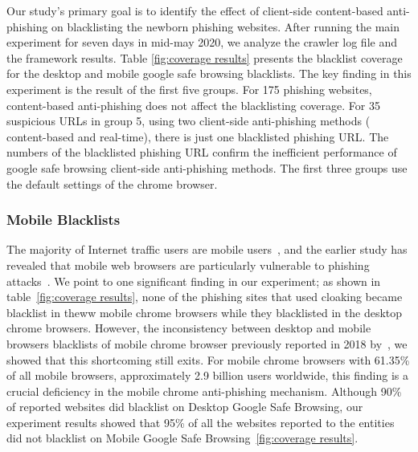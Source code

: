 \documentclass[letterpaper,twocolumn,10pt]{article}
\begin{document}
Our study's primary goal is to identify the effect of client-side content-based anti-phishing on blacklisting the newborn phishing websites. After running the main experiment for seven days in mid-may 2020, we analyze the crawler log file and the framework results. Table \ref{fig:coverage results} presents the blacklist coverage for the desktop and mobile google safe browsing blacklists. The key finding in this experiment is the result of the first five groups. For 175 phishing websites, content-based anti-phishing does not affect the blacklisting coverage. For  35 suspicious URLs in group 5, using two client-side anti-phishing methods ( content-based and real-time), there is just one blacklisted phishing URL. The numbers of the blacklisted phishing URL confirm the inefficient performance of google safe browsing client-side anti-phishing methods. The first three groups use the default settings of the chrome browser. 

\subsubsection{Mobile Blacklists}
The majority of Internet traffic users are mobile users~\cite{statcounterglobalstats}, and the earlier study has revealed that mobile web browsers are particularly vulnerable to phishing attacks~\cite{luo2017hindsight}.
We point to one significant finding in our experiment; as shown in table~\ref{fig:coverage results}, none of the phishing sites that used cloaking became blacklist in theww  mobile chrome browsers while they blacklisted in the desktop chrome browsers. However, the inconsistency between desktop and mobile browsers blacklists of mobile chrome browser previously reported in 2018 by~\cite{oest2019phishfarm}, we showed that this shortcoming still exits.
For mobile chrome browsers with 61.35\%  of all mobile browsers, approximately 2.9 billion users worldwide, this finding is a crucial deficiency in the mobile chrome anti-phishing mechanism.
Although 90\%  of reported websites did blacklist on Desktop Google Safe Browsing, our experiment results showed that 95\%  of all the websites reported to the entities did not blacklist on Mobile Google Safe Browsing~\ref{fig:coverage results}.
\end{document}
